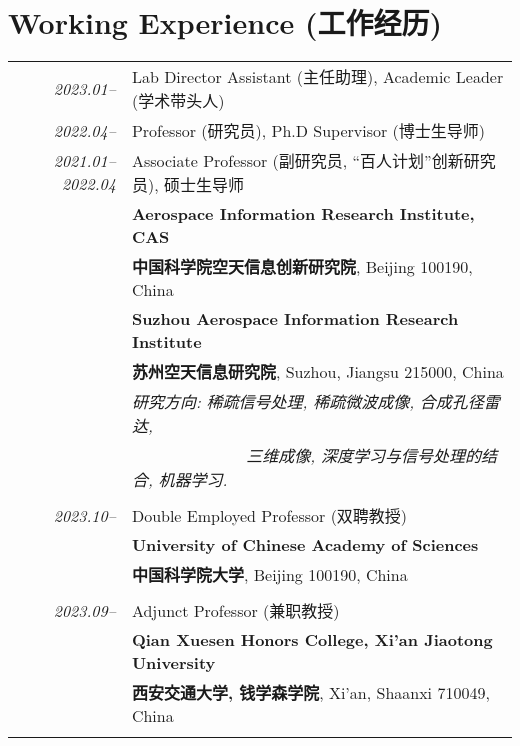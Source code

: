 \documentclass[paper=a4,fontsize=11pt]{scrartcl}
\begin{document}
\section*{Working Experience (工作经历)}

\begin{longtable}{r|p{12cm}}
	
\emph{2023.01--} & Lab Director Assistant (主任助理), Academic Leader (学术带头人)\\	
\emph{2022.04--} & Professor (研究员), Ph.D Supervisor (博士生导师)\\	
\emph{2021.01--2022.04} & Associate Professor (副研究员, ``百人计划''创新研究员), 硕士生导师\\	
	& \normalsize\textbf{Aerospace Information Research Institute, CAS}\\
	& \normalsize\textbf{中国科学院空天信息创新研究院}, Beijing 100190, China \\
	& \normalsize\textbf{Suzhou Aerospace Information Research Institute}\\
	& \normalsize\textbf{苏州空天信息研究院}, Suzhou, Jiangsu 215000, China\\
	& \emph{研究方向: 稀疏信号处理, 稀疏微波成像, 合成孔径雷达,}\\
	& \emph{~~~~~~~~~~~~~~三维成像, 深度学习与信号处理的结合, 机器学习.} \\
	\multicolumn{2}{c}{} \\
	
\emph{2023.10--} & Double Employed Professor (双聘教授)\\	
& \normalsize\textbf{University of Chinese Academy of Sciences}\\
& \normalsize\textbf{中国科学院大学}, Beijing 100190, China \\
\multicolumn{2}{c}{} \\

\emph{2023.09--} & Adjunct Professor (兼职教授)\\	
& \normalsize\textbf{Qian Xuesen Honors College, Xi'an Jiaotong University}\\
& \normalsize\textbf{西安交通大学, 钱学森学院}, Xi'an, Shaanxi 710049, China \\
\multicolumn{2}{c}{} \\


\end{longtable}
\end{document}
